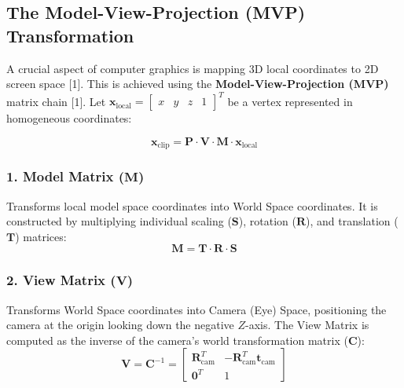 \documentclass[11pt,a4paper,oneside]{article}
\begin{document}
\subsection{The Model-View-Projection (MVP) Transformation}
A crucial aspect of computer graphics is mapping 3D local coordinates to 2D screen space [1]. This is achieved using the \textbf{Model-View-Projection (MVP)} matrix chain [1]. Let $\mathbf{x}_{\text{local}} = \begin{bmatrix} x & y & z & 1 \end{bmatrix}^T$ be a vertex represented in homogeneous coordinates:

\begin{equation}
    \mathbf{x}_{\text{clip}} = \mathbf{P} \cdot \mathbf{V} \cdot \mathbf{M} \cdot \mathbf{x}_{\text{local}}
\end{equation}

\subsubsection{1. Model Matrix (\texorpdfstring{$\mathbf{M}$}{M})}
Transforms local model space coordinates into World Space coordinates. It is constructed by multiplying individual scaling ($\mathbf{S}$), rotation ($\mathbf{R}$), and translation ($\mathbf{T}$) matrices:
\begin{equation}
    \mathbf{M} = \mathbf{T} \cdot \mathbf{R} \cdot \mathbf{S}
\end{equation}

\subsubsection{2. View Matrix (\texorpdfstring{$\mathbf{V}$}{V})}
Transforms World Space coordinates into Camera (Eye) Space, positioning the camera at the origin looking down the negative $Z$-axis. The View Matrix is computed as the inverse of the camera's world transformation matrix ($\mathbf{C}$):
\begin{equation}
    \mathbf{V} = \mathbf{C}^{-1} = \begin{bmatrix} \mathbf{R}_{\text{cam}}^T & -\mathbf{R}_{\text{cam}}^T \mathbf{t}_{\text{cam}} \\ \mathbf{0}^T & 1 \end{bmatrix}
\end{equation}
\end{document}
